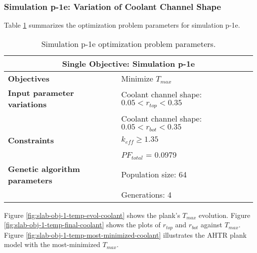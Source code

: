 \subsubsection{Simulation p-1e: Variation of Coolant Channel Shape}
Table \ref{tab:simulationp1e} summarizes the optimization problem parameters for 
simulation p-1e.  
\begin{table}[htbp!]
    \centering
    \onehalfspacing
    \caption{Simulation p-1e optimization problem parameters.}
	\label{tab:simulationp1e}
    \footnotesize
    \begin{tabular}{l|p{6.5cm}}
    \hline 
    \multicolumn{2}{c}{\textbf{Single Objective: Simulation p-1e}} \\
    \hline 
    \textbf{Objectives} & Minimize $T_{max}$ \\
    \hline 
    \textbf{Input parameter variations} 
    & Coolant channel shape: $0.05<r_{top}<0.35$ \\
    & Coolant channel shape: $0.05<r_{bot}<0.35$ \\
    \hline
    \textbf{Constraints} & $k_{eff} \geq 1.35$\\ 
    & $PF_{total}$ = 0.0979\\
    \hline 
    \textbf{Genetic algorithm parameters} & Population size: 64 \\
    & Generations: 4 \\
    \hline
    \end{tabular}
\end{table}
Figure \ref{fig:slab-obj-1-temp-evol-coolant} shows the plank's $T_{max}$ evolution.
Figure \ref{fig:slab-obj-1-temp-final-coolant} shows the plots of $r_{top}$ and 
$r_{bot}$ against $T_{max}$.
Figure \ref{fig:slab-obj-1-temp-most-minimized-coolant} illustrates the \gls{AHTR} 
plank model with the most-minimized $T_{max}$. 
